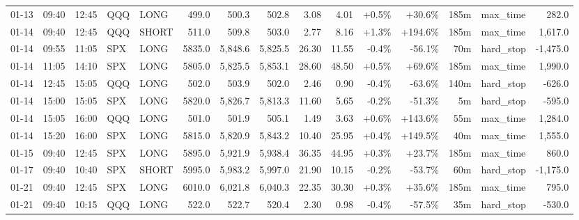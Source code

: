 \documentclass[11pt,a4paper,twoside]{article}
\begin{document}
\begin{landscape}
\begin{center}
\begin{longtable}{>{\color{txtmain}}l l l l l r r r r r r r r >{\color{txtmain}}l r}
01-13 & 09:40 & 12:45 & QQQ & LONG & 499.0 & 500.3 & 502.8 & 3.08 & 4.01 & \textcolor{wingreen}{+0.5\%} & \textcolor{wingreen}{+30.6\%} & 185m & max\_time & \textcolor{wingreen}{282.0} \\
01-14 & 09:40 & 12:45 & QQQ & SHORT & 511.0 & 509.8 & 503.0 & 2.77 & 8.16 & \textcolor{wingreen}{+1.3\%} & \textcolor{wingreen}{+194.6\%} & 185m & max\_time & \textcolor{wingreen}{1,617.0} \\
01-14 & 09:55 & 11:05 & SPX & LONG & 5835.0 & 5,848.6 & 5,825.5 & 26.30 & 11.55 & \textcolor{lossred}{-0.4\%} & \textcolor{lossred}{-56.1\%} & 70m & hard\_stop & \textcolor{lossred}{-1,475.0} \\
01-14 & 11:05 & 14:10 & SPX & LONG & 5805.0 & 5,825.5 & 5,853.1 & 28.60 & 48.50 & \textcolor{wingreen}{+0.5\%} & \textcolor{wingreen}{+69.6\%} & 185m & max\_time & \textcolor{wingreen}{1,990.0} \\
01-14 & 12:45 & 15:05 & QQQ & LONG & 502.0 & 503.9 & 502.0 & 2.46 & 0.90 & \textcolor{lossred}{-0.4\%} & \textcolor{lossred}{-63.6\%} & 140m & hard\_stop & \textcolor{lossred}{-626.0} \\
01-14 & 15:00 & 15:05 & SPX & LONG & 5820.0 & 5,826.7 & 5,813.3 & 11.60 & 5.65 & \textcolor{lossred}{-0.2\%} & \textcolor{lossred}{-51.3\%} & 5m & hard\_stop & \textcolor{lossred}{-595.0} \\
01-14 & 15:05 & 16:00 & QQQ & LONG & 501.0 & 501.9 & 505.1 & 1.49 & 3.63 & \textcolor{wingreen}{+0.6\%} & \textcolor{wingreen}{+143.6\%} & 55m & max\_time & \textcolor{wingreen}{1,284.0} \\
01-14 & 15:20 & 16:00 & SPX & LONG & 5815.0 & 5,820.9 & 5,843.2 & 10.40 & 25.95 & \textcolor{wingreen}{+0.4\%} & \textcolor{wingreen}{+149.5\%} & 40m & max\_time & \textcolor{wingreen}{1,555.0} \\
01-15 & 09:40 & 12:45 & SPX & LONG & 5895.0 & 5,921.9 & 5,938.4 & 36.35 & 44.95 & \textcolor{wingreen}{+0.3\%} & \textcolor{wingreen}{+23.7\%} & 185m & max\_time & \textcolor{wingreen}{860.0} \\
01-17 & 09:40 & 10:40 & SPX & SHORT & 5995.0 & 5,983.2 & 5,997.0 & 21.90 & 10.15 & \textcolor{lossred}{-0.2\%} & \textcolor{lossred}{-53.7\%} & 60m & hard\_stop & \textcolor{lossred}{-1,175.0} \\
01-21 & 09:40 & 12:45 & SPX & LONG & 6010.0 & 6,021.8 & 6,040.3 & 22.35 & 30.30 & \textcolor{wingreen}{+0.3\%} & \textcolor{wingreen}{+35.6\%} & 185m & max\_time & \textcolor{wingreen}{795.0} \\
01-21 & 09:40 & 10:15 & QQQ & LONG & 522.0 & 522.7 & 520.4 & 2.30 & 0.98 & \textcolor{lossred}{-0.4\%} & \textcolor{lossred}{-57.5\%} & 35m & hard\_stop & \textcolor{lossred}{-530.0} \\

\end{longtable}
\end{center}
\end{landscape}
\end{document}
